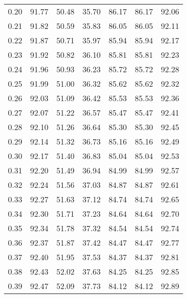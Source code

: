 \begin{tabular}{|c|c|c|c|c|c|c|}
      0.20 &     91.77 &     50.48 &      35.70 &   86.17 &      86.17 &         92.06 \\
      0.21 &     91.82 &     50.59 &      35.83 &   86.05 &      86.05 &         92.11 \\
      0.22 &     91.87 &     50.71 &      35.97 &   85.94 &      85.94 &         92.17 \\
      0.23 &     91.92 &     50.82 &      36.10 &   85.81 &      85.81 &         92.23 \\
      0.24 &     91.96 &     50.93 &      36.23 &   85.72 &      85.72 &         92.28 \\
      0.25 &     91.99 &     51.00 &      36.32 &   85.62 &      85.62 &         92.32 \\
      0.26 &     92.03 &     51.09 &      36.42 &   85.53 &      85.53 &         92.36 \\
      0.27 &     92.07 &     51.22 &      36.57 &   85.47 &      85.47 &         92.41 \\
      0.28 &     92.10 &     51.26 &      36.64 &   85.30 &      85.30 &         92.45 \\
      0.29 &     92.14 &     51.32 &      36.73 &   85.16 &      85.16 &         92.49 \\
      0.30 &     92.17 &     51.40 &      36.83 &   85.04 &      85.04 &         92.53 \\
      0.31 &     92.20 &     51.49 &      36.94 &   84.99 &      84.99 &         92.57 \\
      0.32 &     92.24 &     51.56 &      37.03 &   84.87 &      84.87 &         92.61 \\
      0.33 &     92.27 &     51.63 &      37.12 &   84.74 &      84.74 &         92.65 \\
      0.34 &     92.30 &     51.71 &      37.23 &   84.64 &      84.64 &         92.70 \\
      0.35 &     92.34 &     51.78 &      37.32 &   84.54 &      84.54 &         92.74 \\
      0.36 &     92.37 &     51.87 &      37.42 &   84.47 &      84.47 &         92.77 \\
      0.37 &     92.40 &     51.95 &      37.53 &   84.37 &      84.37 &         92.81 \\
      0.38 &     92.43 &     52.02 &      37.63 &   84.25 &      84.25 &         92.85 \\
      0.39 &     92.47 &     52.09 &      37.73 &   84.12 &      84.12 &         92.89 \\

\end{tabular}

